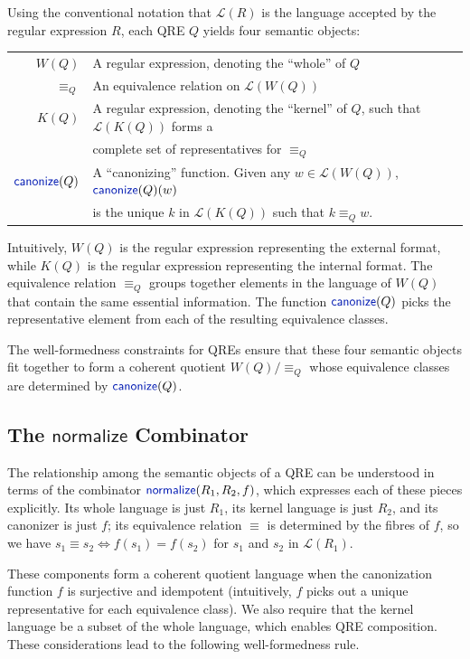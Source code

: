 \documentclass[acmsmall,screen]{acmart}
\newcommand{\kw}[1]{\textcolor{dkblue}{\ensuremath{\mathsf{#1}}}}
\newcommand{\normalize}[3]{\ensuremath{\kw{normalize}(#1, #2, #3)}}
\newcommand{\eqrel}[1]{\ensuremath{\equiv_{#1}}}
\newcommand{\canonize}{\ensuremath{\kw{canonize}}}
\begin{document}
Using the conventional notation that $\mathcal{L}(R)$ is the language accepted
by the regular expression $R$, each QRE $Q$ yields four semantic
objects:

\begin{tabular}{rl}
  $W(Q)$       & A regular expression, denoting the ``whole'' of $Q$\\
  $\eqrel{Q}$  & An equivalence relation on $\mathcal{L}(W(Q))$\\
  $K(Q)$       & A regular expression, denoting the ``kernel'' of $Q$, such that
                  $\mathcal{L}(K(Q))$ forms a \\
               & complete set of representatives for $\eqrel{Q}$ \\
  $\canonize(Q)$ & 
  A ``canonizing'' function. Given any $w \in \mathcal{L}(W(Q))$,
  $\canonize(Q)(w)$ \\ & is the unique $k$ in $\mathcal{L}(K(Q))$ such
  that $k \eqrel{Q} w$.
\end{tabular}

\noindent
Intuitively, $W(Q)$ is the regular expression representing the
external format, while $K(Q)$ is the regular expression representing
the internal format.  The equivalence relation $\eqrel{Q}$ groups
together elements in the language of $W(Q)$ that contain the same
essential information.  The function $\canonize(Q)$ picks the
representative element from each of the resulting equivalence classes.

The well-formedness constraints for QREs ensure that these four semantic
objects fit together to form a coherent quotient $W(Q)/\eqrel{Q}$ whose
equivalence classes are determined by $\canonize(Q)$.

\subsection{The \kw{normalize} Combinator}

The relationship among the semantic objects of a QRE can be understood in terms
of the combinator \normalize{R_1}{R_2}{f}, which expresses each of these pieces
explicitly.  Its whole language is just $R_1$, its kernel language is just
$R_2$, and its canonizer is just $f$; 
its equivalence relation $\equiv$ is
determined by the fibres of $f$, so we have
$s_1 \equiv s_2 \Leftrightarrow f(s_1) = f(s_2)$ for $s_1$ and $s_2$
in $\mathcal{L}(R_1)$.

These components form a coherent quotient language when the canonization
function $f$ is surjective and idempotent (intuitively, $f$ picks out a unique
representative for each equivalence class).  We also require that the kernel
language be a subset of the whole language, which enables QRE composition.
These considerations lead to the following well-formedness rule.
\end{document}
